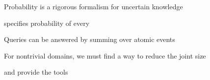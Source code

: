 \documentclass{article}
\begin{document}
\begin{huge}

Probability is a rigorous formalism for uncertain knowledge

 specifies probability of every 

Queries can be answered by summing over atomic events

For nontrivial domains, we must find a way to reduce the joint size

 and  provide the tools










\end{huge} 
\end{document}
